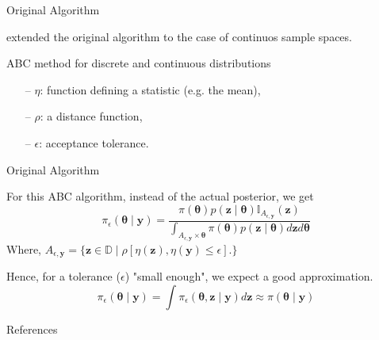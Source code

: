 \documentclass[10pt]{beamer}
\begin{document}
\begin{frame}[fragile]{Original Algorithm}

  \citet{Pritchard1999} extended the original algorithm to the case
  of continuos sample spaces.

  \vspace{0.3cm}

\begin{algorithm}[H]
\SetAlgoLined
{}
 \caption{ABC method for discrete and continuous distributions}
\end{algorithm}
\begin{itemize}
  \item[--] $\eta$: function defining a statistic (e.g. the mean),
  \item[--] $\rho$: a distance function,
  \item[--] $\epsilon$: acceptance tolerance.
\end{itemize}

\end{frame}

\begin{frame}[fragile]{Original Algorithm}

  For this ABC algorithm, instead of the actual posterior,
  we get
  $$
  \pi_\epsilon(\bm \theta \mid \bm y) = 
  \frac{\pi(\bm \theta) p(\bm z \mid \bm \theta)
  \mathbb I_{A_{\epsilon,\bm y}}(\bm z)}
  {\int_{A_{\epsilon,\bm y}\times \bm\theta}\pi(\bm \theta)
  p(\bm z \mid \bm \theta)d\bm z d \bm \theta}
  $$
  Where, $A_{\epsilon,\bm y} = \{
  \bm z \in \mathbb D \mid \rho[\eta(\bm z), \eta(\bm y) \leq \epsilon].
  \}$
  
  Hence, for a tolerance ($\epsilon$) "small enough", we expect a good
  approximation.
  $$\pi_\epsilon(\bm \theta \mid \bm y) = 
  \int \pi_\epsilon(\bm \theta, \bm z \mid \bm y) d \bm z \approx
  \pi(\bm \theta \mid \bm y)$$

\end{frame}


\begin{frame}[allowframebreaks]{References}

  \renewcommand{\section}[2]{}%
  
  

\end{frame}
\end{document}
